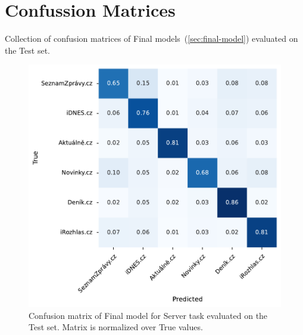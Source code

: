 \chapter{Confussion Matrices}
Collection of confusion matrices of Final models~(\autoref{sec:final-model}) evaluated on the Test set.
\begin{figure}
    \centering
    \includegraphics[width=1.0\textwidth]{img/conf_matrix/server_test_confusion_matrix.pdf}
    \caption{Confusion matrix of Final model for Server task evaluated on the Test set. Matrix is normalized over True values.}
    \label{fig:server-conf}
\end{figure}
